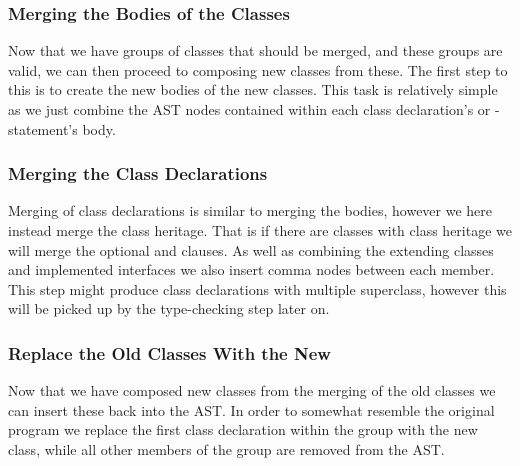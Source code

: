 \subsubsection{Merging the Bodies of the Classes}

Now that we have groups of classes that should be merged, and these groups are valid, we can then proceed to composing new classes from these.
The first step to this is to create the new bodies of the new classes.
This task is relatively simple as we just combine the AST nodes contained within each class declaration's or -statement's body.


\subsubsection{Merging the Class Declarations}

Merging of class declarations is similar to merging the bodies, however we here instead merge the class heritage.
That is if there are classes with class heritage we will merge the optional  and  clauses.
As well as combining the extending classes and implemented interfaces we also insert comma nodes between each member.
This step might produce class declarations with multiple superclass, however this will be picked up by the type-checking step later on.

\subsubsection{Replace the Old Classes With the New}

Now that we have composed new classes from the merging of the old classes we can insert these back into the AST.
In order to somewhat resemble the original program we replace the first class declaration within the group with the new class, while all other members of the group are removed from the AST\@.
